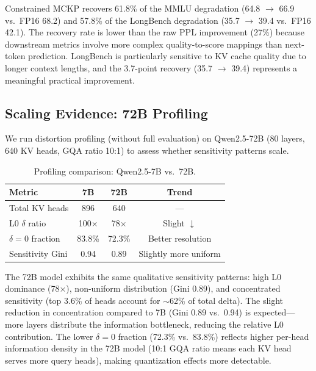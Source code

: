 \documentclass[11pt,a4paper]{article}
\begin{document}
Constrained MCKP recovers 61.8\% of the MMLU degradation (64.8 $\to$ 66.9 vs.\ FP16 68.2) and 57.8\% of the LongBench degradation (35.7 $\to$ 39.4 vs.\ FP16 42.1).
The recovery rate is lower than the raw PPL improvement (27\%) because downstream metrics involve more complex quality-to-score mappings than next-token prediction.
LongBench is particularly sensitive to KV cache quality due to longer context lengths, and the 3.7-point recovery (35.7 $\to$ 39.4) represents a meaningful practical improvement.

\subsection{Scaling Evidence: 72B Profiling}
\label{sec:72b}

We run distortion profiling (without full evaluation) on Qwen2.5-72B (80 layers, 640 KV heads, GQA ratio 10:1) to assess whether sensitivity patterns scale.

\begin{table}[t]
\centering
\small
\caption{Profiling comparison: Qwen2.5-7B vs.\ 72B.}
\label{tab:72b}
\begin{tabular}{lccc}
\toprule
\textbf{Metric} & \textbf{7B} & \textbf{72B} & \textbf{Trend} \\
\midrule
Total KV heads       & 896  & 640  & --- \\
L0 $\delta$ ratio    & 100$\times$ & 78$\times$ & Slight $\downarrow$ \\
$\delta{=}0$ fraction & 83.8\% & 72.3\% & Better resolution \\
Sensitivity Gini     & 0.94 & 0.89 & Slightly more uniform \\
\bottomrule
\end{tabular}
\end{table}

The 72B model exhibits the same qualitative sensitivity patterns: high L0 dominance (78$\times$), non-uniform distribution (Gini 0.89), and concentrated sensitivity (top 3.6\% of heads account for $\sim$62\% of total delta).
The slight reduction in concentration compared to 7B (Gini 0.89 vs.\ 0.94) is expected---more layers distribute the information bottleneck, reducing the relative L0 contribution.
The lower $\delta{=}0$ fraction (72.3\% vs.\ 83.8\%) reflects higher per-head information density in the 72B model (10:1 GQA ratio means each KV head serves more query heads), making quantization effects more detectable.
\end{document}
